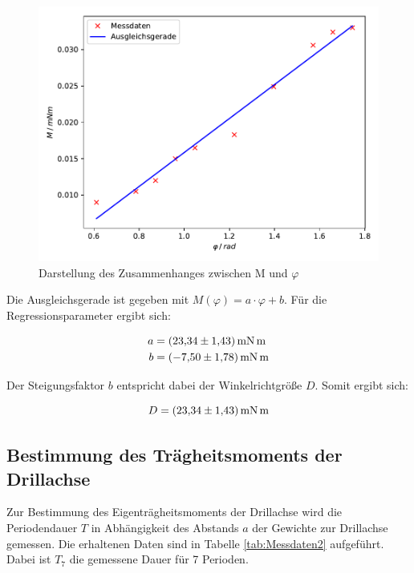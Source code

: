 \begin{figure}
  \centering
  \includegraphics[scale=0.8]{content/plot1.pdf}
  \caption{Darstellung des Zusammenhanges zwischen M und $\varphi$}
  \label{fig:plot1}
\end{figure}

Die Ausgleichsgerade ist gegeben mit $M(\varphi) = a\cdot \varphi + b$. Für die Regressionsparameter
ergibt sich: 

\begin{align*}
a &= \SI{23.34+-1.43}{\milli\newton\meter} \\
b &= \SI{-7.5+-1.78}{\milli\newton\meter}
\end{align*}

Der Steigungsfaktor $b$ entspricht dabei der Winkelrichtgröße $D$. Somit ergibt sich: 

\begin{equation*}
D = \SI{23.34+-1.43}{\milli\newton\meter}
\end{equation*}

\subsection{Bestimmung des Trägheitsmoments der Drillachse}

Zur Bestimmung des Eigenträgheitsmoments der Drillachse wird die Periodendauer $T$ in Abhängigkeit 
des Abstands $a$ der Gewichte zur Drillachse gemessen. Die erhaltenen Daten sind in Tabelle 
\ref{tab:Messdaten2} aufgeführt. Dabei ist $T_7$ die gemessene Dauer für 7 Perioden.

